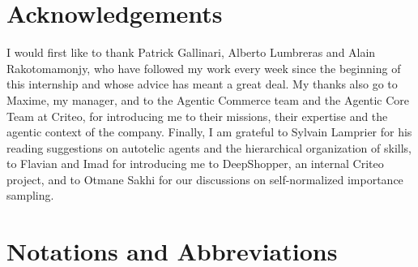 \documentclass[11pt,a4paper]{article}
\begin{document}
\newpage




\section*{Acknowledgements}

I would first like to thank Patrick Gallinari, Alberto Lumbreras and Alain Rakotomamonjy, who have followed my work every week since the beginning of this internship and whose advice has meant a great deal. My thanks also go to Maxime, my manager, and to the Agentic Commerce team and the Agentic Core Team at Criteo, for introducing me to their missions, their expertise and the agentic context of the company. Finally, I am grateful to Sylvain Lamprier for his reading suggestions on autotelic agents and the hierarchical organization of skills, to Flavian and Imad for introducing me to DeepShopper, an internal Criteo project, and to Otmane Sakhi for our discussions on self-normalized importance sampling.








\vspace{0.5cm}

\newpage
\setcounter{tocdepth}{2} %
\tableofcontents

\newpage
\section*{Notations and Abbreviations}
\end{document}
